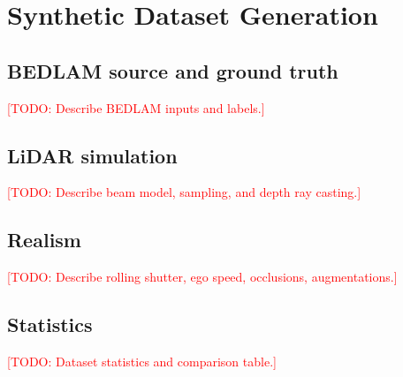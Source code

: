 \documentclass{egpubl}
\newcommand{\todo}[1]{\textcolor{red}{[TODO: #1]}}
\begin{document}
\section{Synthetic Dataset Generation}
\label{sec:dataset}

\subsection{BEDLAM source and ground truth}
\todo{Describe BEDLAM inputs and labels.}

\subsection{LiDAR simulation}
\todo{Describe beam model, sampling, and depth ray casting.}

\subsection{Realism}
\todo{Describe rolling shutter, ego speed, occlusions, augmentations.}

\subsection{Statistics}
\todo{Dataset statistics and comparison table.}
\end{document}
